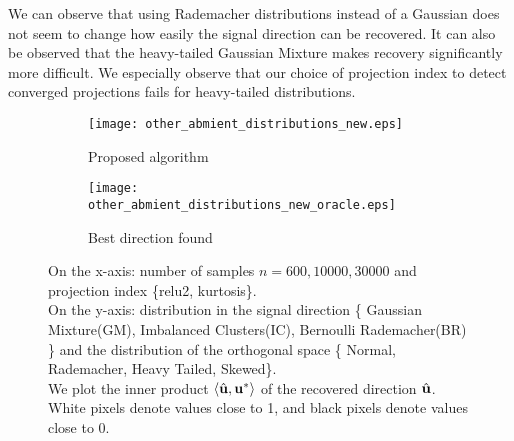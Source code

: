 We can observe that using Rademacher distributions instead of a Gaussian does not seem to change how easily the signal direction can be recovered.
It can also be observed that the heavy-tailed Gaussian Mixture makes recovery significantly more difficult.
We especially observe that our choice of projection index to detect converged projections fails for heavy-tailed distributions.

\begin{figure}
    \centering
    \begin{subfigure}[b]{0.49\textwidth}
        \texttt{[image: other\_abmient\_distributions\_new.eps]}
        \caption{Proposed algorithm}
    \end{subfigure}
    \begin{subfigure}[b]{0.49\textwidth}
        \texttt{[image: other\_abmient\_distributions\_new\_oracle.eps]}
        \caption{Best direction found}
    \end{subfigure}
    
    \caption{
        On the x-axis: number of samples $n = 600, 10000, 30000$ and projection index \{relu2, kurtosis\}.\\
        On the y-axis: distribution in the signal direction \{ Gaussian Mixture(GM), Imbalanced Clusters(IC), Bernoulli Rademacher(BR) \} and the distribution of the orthogonal space \{ Normal, Rademacher, Heavy Tailed, Skewed\}.\\
        We plot the inner product $\left\langle \hat{\mathbf{u}}, \mathbf{u}^* \right\rangle$ of the recovered direction $\hat{\mathbf{u}}$.
        White pixels denote values close to 1, and black pixels denote values close to 0.
    }
    \label{other_ambient}
\end{figure}
